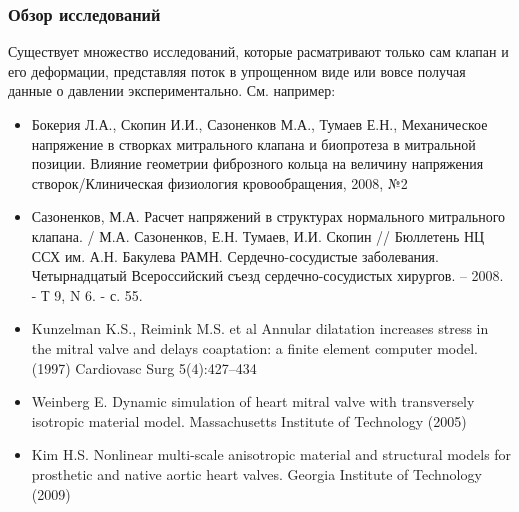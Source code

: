 \documentclass[14pt]{beamer}
\begin{document}
\begin{frame}
\frametitle{Обзор исследований}
    Существует множество исследований, которые расматривают только сам клапан и его деформации,
    представляя поток в упрощенном виде или вовсе получая данные о давлении экспериментально. См. например:\\
    \par
    {\tiny
        \begin{itemize}
            \item[\MVRightarrow] Бокерия Л.А., Скопин И.И., Сазоненков М.А., Тумаев Е.Н., Механическое напряжение в створках митрального клапана и биопротеза в митральной позиции. Влияние геометрии фиброзного кольца на величину напряжения створок/Клиническая физиология кровообращения, 2008, №2
            \item[\MVRightarrow] Сазоненков, М.А. Расчет напряжений в структурах нормального митрального клапана. / М.А. Сазоненков, Е.Н. Тумаев, И.И. Скопин // Бюллетень НЦ ССХ им. А.Н. Бакулева РАМН. Сердечно-сосудистые заболевания. Четырнадцатый Всероссийский съезд сердечно-сосудистых хирургов. – 2008. - Т 9, N 6. - с. 55.
            \item[\MVRightarrow] Kunzelman K.S., Reimink M.S. et al  Annular dilatation increases stress in the mitral valve and delays coaptation: a finite element computer model. (1997) Cardiovasc Surg 5(4):427–434
            \item[\MVRightarrow] Weinberg E. Dynamic simulation of heart mitral valve with transversely isotropic material model. Massachusetts Institute of Technology (2005)
            \item[\MVRightarrow] Kim H.S. Nonlinear multi-scale anisotropic material and structural models for prosthetic and native aortic heart valves. Georgia Institute of Technology (2009)
        \end{itemize}
    }
\end{frame}
\end{document}
